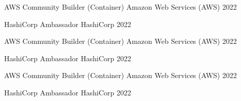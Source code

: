 \begin{cvhonors}

  \cvhonor
    {AWS Community Builder (Container)} %
    {Amazon Web Services (AWS)} %
    {} %
    {2022} %

  \cvhonor
    {HashiCorp Ambassador} %
    {HashiCorp} %
    {} %
    {2022} %


\end{cvhonors}



\begin{cvhonors}

  \cvhonor
    {AWS Community Builder (Container)} %
    {Amazon Web Services (AWS)} %
    {} %
    {2022} %

  \cvhonor
    {HashiCorp Ambassador} %
    {HashiCorp} %
    {} %
    {2022} %

\end{cvhonors}



\begin{cvhonors}

  \cvhonor
    {AWS Community Builder (Container)} %
    {Amazon Web Services (AWS)} %
    {} %
    {2022} %

  \cvhonor
    {HashiCorp Ambassador} %
    {HashiCorp} %
    {} %
    {2022} %

\end{cvhonors}
